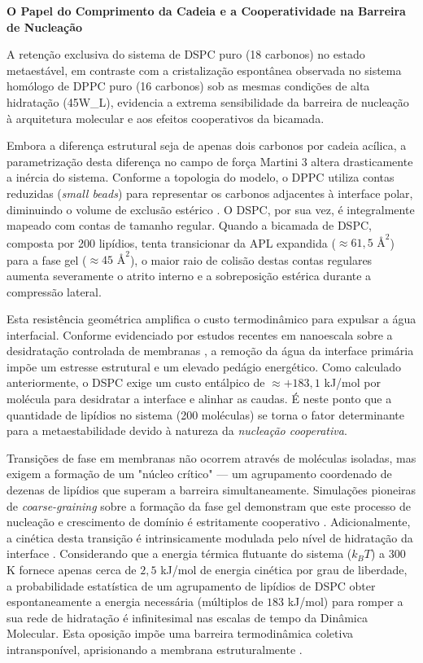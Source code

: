 \vspace{1em}
\noindent\textbf{O Papel do Comprimento da Cadeia e a Cooperatividade na Barreira de Nucleação}

A retenção exclusiva do sistema de DSPC puro (18 carbonos) no estado metaestável, em contraste com a cristalização espontânea observada no sistema homólogo de DPPC puro (16 carbonos) sob as mesmas condições de alta hidratação (45W\_L), evidencia a extrema sensibilidade da barreira de nucleação à arquitetura molecular e aos efeitos cooperativos da bicamada. 

Embora a diferença estrutural seja de apenas dois carbonos por cadeia acílica, a parametrização desta diferença no campo de força Martini 3 altera drasticamente a inércia do sistema. Conforme a topologia do modelo, o DPPC utiliza contas reduzidas (\textit{small beads}) para representar os carbonos adjacentes à interface polar, diminuindo o volume de exclusão estérico \cite{liu2012}. O DSPC, por sua vez, é integralmente mapeado com contas de tamanho regular. Quando a bicamada de DSPC, composta por 200 lipídios, tenta transicionar da APL expandida ($\approx 61,5 \text{ \AA}^2$) para a fase gel ($\approx 45 \text{ \AA}^2$), o maior raio de colisão destas contas regulares aumenta severamente o atrito interno e a sobreposição estérica durante a compressão lateral.

Esta resistência geométrica amplifica o custo termodinâmico para expulsar a água interfacial. Conforme evidenciado por estudos recentes em nanoescala sobre a desidratação controlada de membranas \cite{krok2024}, a remoção da água da interface primária impõe um estresse estrutural e um elevado pedágio energético. Como calculado anteriormente, o DSPC exige um custo entálpico de $\approx +183,1$ kJ/mol por molécula para desidratar a interface e alinhar as caudas. É neste ponto que a quantidade de lipídios no sistema (200 moléculas) se torna o fator determinante para a metaestabilidade devido à natureza da \textit{nucleação cooperativa}.

Transições de fase em membranas não ocorrem através de moléculas isoladas, mas exigem a formação de um "núcleo crítico" --- um agrupamento coordenado de dezenas de lipídios que superam a barreira simultaneamente. Simulações pioneiras de \textit{coarse-graining} sobre a formação da fase gel demonstram que este processo de nucleação e crescimento de domínio é estritamente cooperativo \cite{marrink2005}. Adicionalmente, a cinética desta transição é intrinsicamente modulada pelo nível de hidratação da interface \cite{kowalik2015}. Considerando que a energia térmica flutuante do sistema ($k_B T$) a 300 K fornece apenas cerca de $2,5$ kJ/mol de energia cinética por grau de liberdade, a probabilidade estatística de um agrupamento de lipídios de DSPC obter espontaneamente a energia necessária (múltiplos de $183$ kJ/mol) para romper a sua rede de hidratação é infinitesimal nas escalas de tempo da Dinâmica Molecular. Esta oposição impõe uma barreira termodinâmica coletiva intransponível, aprisionando a membrana estruturalmente \cite{raudino2011}.

